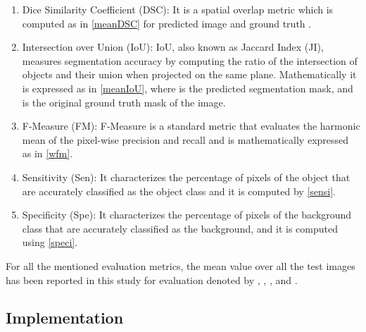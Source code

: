 \documentclass[review]{elsarticle}
\begin{document}
\begin{enumerate}
    
    \item Dice Similarity Coefficient (DSC): It is a spatial overlap metric which is computed as in \autoref{meanDSC} for predicted image  and ground truth . 
    
    
    
    \item Intersection over Union (IoU): IoU, also known as Jaccard Index (JI), measures segmentation accuracy by computing the ratio of the intersection of objects and their union when projected on the same plane. Mathematically it is expressed as in \autoref{meanIoU}, where  is the predicted segmentation mask, and  is the original ground truth mask of the image.
    
    
    \item F-Measure (FM): F-Measure is a standard metric that evaluates the harmonic mean of the pixel-wise precision and recall and is mathematically expressed as in \autoref{wfm}.
    
    
    \item  Sensitivity (Sen): It characterizes the percentage of pixels of the object that are accurately classified as the object class and it is computed by \autoref{sensi}.
    
    
    \item Specificity (Spe): It characterizes the percentage of pixels of the background class that are accurately classified as the background, and it is computed using \autoref{speci}.
    
    
\end{enumerate}
For all the mentioned evaluation metrics, the mean value over all the test images has been reported in this study for evaluation denoted by , , ,  and .


\subsection{Implementation}
\end{document}
